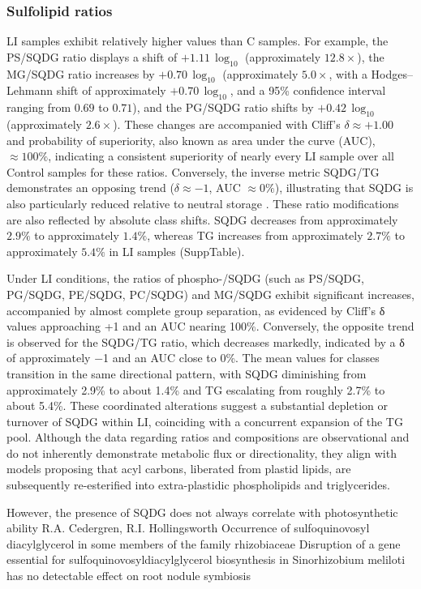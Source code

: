 \documentclass[10pt,letterpaper]{article}
\begin{document}
\subsubsection*{Sulfolipid ratios}
LI samples exhibit relatively higher values than C samples. For example, the PS/SQDG ratio displays a shift of $+1.11 \,\log_{10}$ (approximately $12.8\times$), the MG/SQDG ratio increases by $+0.70 \,\log_{10}$ (approximately $5.0\times$, with a Hodges--Lehmann shift of approximately $+0.70 \,\log_{10}$, and a 95\% confidence interval ranging from $0.69$ to $0.71$), and the PG/SQDG ratio shifts by $+0.42 \,\log_{10}$ (approximately $2.6\times$). These changes are accompanied with Cliff’s $\delta \approx +1.00$ and probability of superiority, also known as area under the curve (AUC), $\approx 100\%$, indicating a consistent superiority of nearly every LI sample over all Control samples for these ratios. Conversely, the inverse metric SQDG/TG demonstrates an opposing trend ($\delta \approx -1$, AUC $\approx 0\%$), illustrating that SQDG is also particularly reduced relative to neutral storage . These ratio modifications are also reflected by absolute class shifts. SQDG decreases from approximately $2.9\%$ to approximately $1.4\%$, whereas TG increases from approximately $2.7\%$ to approximately $5.4\%$ in LI samples (SuppTable). 

Under LI conditions, the ratios of phospho-/SQDG (such as PS/SQDG, PG/SQDG, PE/SQDG, PC/SQDG) and MG/SQDG exhibit significant increases, accompanied by almost complete group separation, as evidenced by Cliff’s δ values approaching +1 and an AUC nearing 100\%. Conversely, the opposite trend is observed for the SQDG/TG ratio, which decreases markedly, indicated by a δ of approximately −1 and an AUC close to 0\%. The mean values for classes transition in the same directional pattern, with SQDG diminishing from approximately 2.9\% to about 1.4\% and TG escalating from roughly 2.7\% to about 5.4\%. These coordinated alterations suggest a substantial depletion or turnover of SQDG within LI, coinciding with a concurrent expansion of the TG pool. Although the data regarding ratios and compositions are observational and do not inherently demonstrate metabolic flux or directionality, they align with models proposing that acyl carbons, liberated from plastid lipids, are subsequently re-esterified into extra-plastidic phospholipids and triglycerides.



However, the presence of SQDG does not always correlate with photosynthetic ability
R.A. Cedergren, R.I. Hollingsworth
Occurrence of sulfoquinovosyl diacylglycerol in some members of the family rhizobiaceae
Disruption of a gene essential for sulfoquinovosyldiacylglycerol biosynthesis in Sinorhizobium meliloti has no detectable effect on root nodule symbiosis
\end{document}
